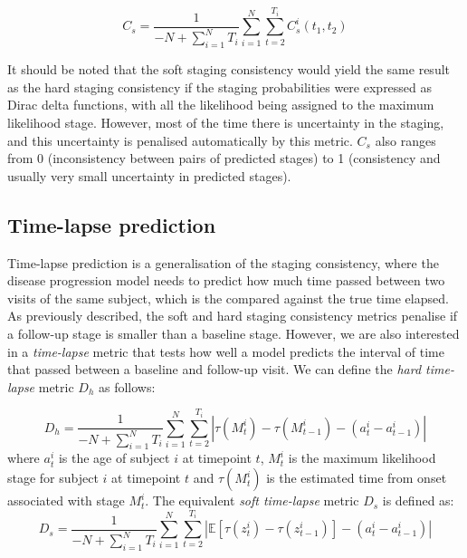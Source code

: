 \begin{equation}
C_s = \frac{1}{-N +\sum_{i=1}^N T_i} \sum_{i=1}^N \sum_{t=2}^{T_i} C_s^i(t_1,t_2) 
\end{equation}

It should be noted that the soft staging consistency would yield the same result as the hard staging consistency if the staging probabilities were expressed as Dirac delta functions, with all the likelihood being assigned to the maximum likelihood stage. However, most of the time there is uncertainty in the staging, and this uncertainty is penalised automatically by this metric. $C_s$ also ranges from 0 (inconsistency between pairs of predicted stages) to 1 (consistency and usually very small uncertainty in predicted stages).

\subsection{Time-lapse prediction}
\label{sec:timeLapse}

Time-lapse prediction is a generalisation of the staging consistency, where the disease progression model needs to predict how much time passed between two visits of the same subject, which is the compared against the true time elapsed. As previously described, the soft and hard staging consistency metrics penalise if a follow-up stage is smaller than a baseline stage. However, we are also interested in a \emph{time-lapse} metric that tests how well a model predicts the interval of time that passed between a baseline and follow-up visit. We can define the \emph{hard time-lapse} metric $D_h$ as follows:

\begin{equation}
D_h = \frac{1}{-N +\sum_{i=1}^N T_i} \sum_{i=1}^N \sum_{t=2}^{T_i} \left| \tau(M^i_t) - \tau(M^i_{t-1}) - (a^i_t - a^i_{t-1}) \right|
\end{equation}
where $a^i_t$ is the age of subject $i$ at timepoint $t$, $M^i_t$ is the maximum likelihood stage for subject $i$ at timepoint $t$ and $\tau(M^i_t)$ is the estimated time from onset associated with stage $M^i_t$. The equivalent \emph{soft time-lapse} metric $D_s$ is defined as:
\begin{equation}
D_s = \frac{1}{-N +\sum_{i=1}^N T_i} \sum_{i=1}^N \sum_{t=2}^{T_i} \left| \mathbb{E}[\tau(z^i_t) - \tau(z^i_{t-1})] - (a^i_t - a^i_{t-1}) \right|
\end{equation}

